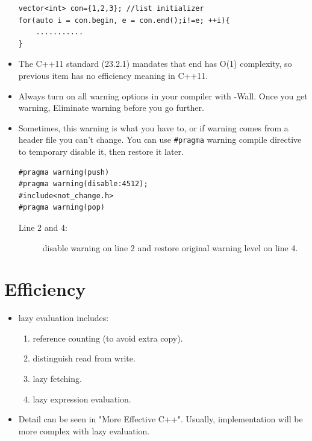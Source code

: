 \documentclass[a4paper,11pt,twoside]{book}
\begin{document}
\begin{itemize}
\begin{lstlisting}[numbers=none]
vector<int> con={1,2,3}; //list initializer
for(auto i = con.begin, e = con.end();i!=e; ++i){
	...........
}
\end{lstlisting}
	
	\item The C++11 standard (23.2.1) mandates that end has O(1) complexity, so previous item has no efficiency meaning in C++11.
	
	
	
	\item Always turn on all warning options in your compiler with -Wall. Once you get warning, Eliminate warning before you go further.
	
	\item Sometimes, this warning is what you have to, or if warning comes from a header file you can't change. You can use \texttt{\#pragma} warning compile directive to temporary disable it, then restore it later.
\begin{lstlisting}[numbers=none]
#pragma warning(push)
#pragma warning(disable:4512);
#include<not_change.h>
#pragma warning(pop)
\end{lstlisting}
\begin{description}
	\item[Line 2 and 4:] disable warning on line 2 and restore original warning level on line 4.
\end{description}
	
\end{itemize}

\section{Efficiency}
\begin{itemize}
	\item  lazy evaluation includes:
	\begin{enumerate}
		\item reference counting (to avoid extra copy).
		\item distinguish read from write.
		\item lazy fetching.
		\item lazy expression evaluation.
	\end{enumerate}
	\item Detail can be seen in "More Effective C++". Usually, implementation will be  more complex with lazy evaluation.
\end{itemize}
\end{document}
